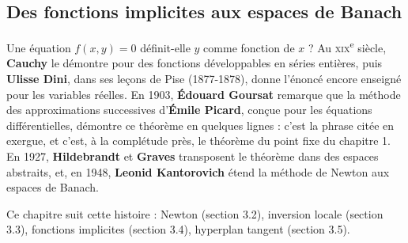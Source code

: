 \documentclass[a4paper,twoside]{report}
\begin{document}
\subsection{Des fonctions implicites aux espaces de Banach}

Une équation $f(x, y) = 0$ définit-elle $y$ comme fonction de $x$ ? Au \textsc{xix}\textsuperscript{e} siècle, \textbf{Cauchy} le démontre pour des fonctions développables en séries entières, puis \textbf{Ulisse Dini}, dans ses leçons de Pise (1877-1878), donne l'énoncé encore enseigné pour les variables réelles. En 1903, \textbf{Édouard Goursat} remarque que la méthode des approximations successives d'\textbf{Émile Picard}, conçue pour les équations différentielles, démontre ce théorème en quelques lignes : c'est la phrase citée en exergue, et c'est, à la complétude près, le théorème du point fixe du chapitre 1. En 1927, \textbf{Hildebrandt} et \textbf{Graves} transposent le théorème dans des espaces abstraits, et, en 1948, \textbf{Leonid Kantorovich} étend la méthode de Newton aux espaces de Banach.

Ce chapitre suit cette histoire : Newton (section 3.2), inversion locale (section 3.3), fonctions implicites (section 3.4), hyperplan tangent (section 3.5).
\end{document}
